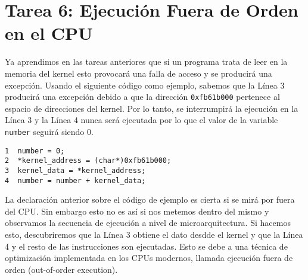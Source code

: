 

%
%
%
%







\section{Tarea 6: Ejecución Fuera de Orden en el CPU}

Ya aprendimos en las tareas anteriores que si un programa trata de leer en la memoria del kernel esto provocará una falla de acceso y se producirá una excepción. 
Usando el siguiente código como ejemplo, sabemos que la Línea 3 producirá una excepción debido a que la dirección \texttt{0xfb61b000} pertenece al espacio de direcciones del kernel. Por lo tanto, se interrumpirá la ejecución en la Línea 3 y la Línea 4 nunca será ejecutada por lo que el valor de la variable \texttt{number} seguirá siendo 0.

\begin{lstlisting}
1  number = 0;
2  *kernel_address = (char*)0xfb61b000;
3  kernel_data = *kernel_address;
4  number = number + kernel_data;
\end{lstlisting}

La declaración anterior sobre el código de ejemplo es cierta si se mirá por fuera del CPU.
Sin embargo esto no es así si nos metemos dentro del mismo y observamos la secuencia de ejecución a nivel de microarquitectura. Si hacemos esto, descubriremos que la Línea 3 obtiene el dato desdde el kernel y que la Línea 4 y el resto de las instrucciones son ejecutadas. Esto se debe a una técnica de optimización implementada en los CPUs modernos, llamada ejecución fuera de orden (out-of-order execution).

